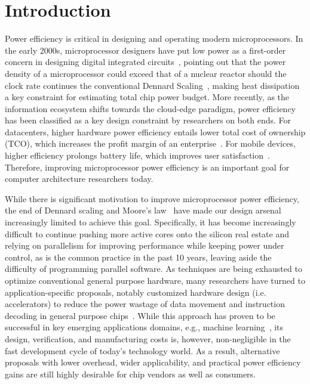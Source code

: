 
\chapter{Introduction}
\label{sec:intro}

Power efficiency is critical in designing and operating modern microprocessors. In the early 2000s, microprocessor designers have put low power as a first-order concern in designing digital integrated circuits~\cite{pedram2002power, rabaey2009low}, pointing out that the power density of a microprocessor could exceed that of a nuclear reactor should the clock rate continues the conventional Dennard Scaling~\cite{rabaey2002digital}, making heat dissipation a key constraint for estimating total chip power budget. More recently, as the information ecosystem shifts towards the cloud-edge paradigm, power efficiency has been classified as a key design constraint by researchers on both ends. For datacenters, higher hardware power efficiency entails lower total cost of ownership (TCO), which increases the profit margin of an enterprise~\cite{barroso2013datacenter}. For mobile devices, higher efficiency prolongs battery life, which improves user satisfaction~\cite{zhu2017energy}. Therefore, improving microprocessor power efficiency is an important goal for computer architecture researchers today.

While there is significant motivation to improve microprocessor power efficiency, the end of Dennard scaling and Moore's law~\cite{esmaeilzadeh2011dark,theis2017end} have made our design arsenal increasingly limited to achieve this goal. Specifically, it has become increasingly difficult to continue pushing more active cores onto the silicon real estate and relying on parallelism for improving performance while keeping power under control, as is the common practice in the past 10 years, leaving aside the difficulty of programming parallel software. As techniques are being exhausted to optimize conventional general purpose hardware, many researchers have turned to application-specific proposals, notably customized hardware design (i.e. accelerators) to reduce the power wastage of data movement and instruction decoding in general purpose chips~\cite{qadeer2015convolution}. While this approach has proven to be successful in key emerging applications domains, e.g., machine learning~\cite{chen2014diannao, jouppi2017datacenter, caulfield2016cloud, dean2018new}, its design, verification, and manufacturing costs is, however, non-negligible in the fast development cycle of today's technology world. As a result, alternative proposals with lower overhead, wider applicability, and practical power efficiency gains are still highly desirable for chip vendors as well as consumers.

